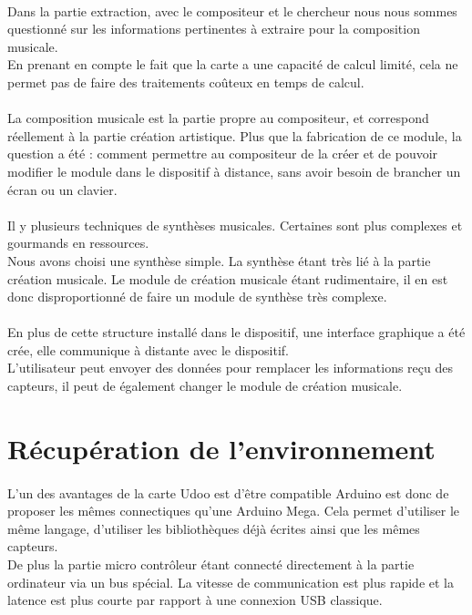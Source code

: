 \documentclass[a4paper, titlepage, oneside, 12pt]{article}%
\begin{document}
\paragraph{}
Dans la partie extraction, avec le compositeur et le chercheur nous nous sommes questionné sur les informations pertinentes à extraire pour la composition musicale.\\ 
En prenant en compte le fait que la carte a une capacité de calcul limité, cela ne permet pas de faire des traitements coûteux en temps de calcul.

\paragraph{}
La composition musicale est la partie propre au compositeur, et correspond réellement à la partie création artistique. Plus que la fabrication de ce module, la question a été :  comment permettre au compositeur de la créer et de pouvoir modifier le module dans le dispositif à distance, sans avoir besoin  de brancher un écran ou un clavier.

\paragraph{}
Il y plusieurs techniques de synthèses musicales. Certaines sont plus complexes et gourmands en ressources.\\ Nous avons choisi une synthèse simple. La synthèse étant très lié à la partie création musicale. Le module de création musicale étant rudimentaire, il en est donc disproportionné de faire un module de synthèse très complexe. 

\paragraph{}
En plus de cette structure installé dans le dispositif, une interface graphique a été crée, elle communique à distante avec le dispositif.\\
L'utilisateur peut envoyer des données pour remplacer les informations reçu des capteurs, il peut de également changer le module de création musicale.

\section{Récupération de l'environnement}
\paragraph{}
L'un des avantages de la carte Udoo est d'être compatible Arduino est donc de proposer les mêmes connectiques qu'une Arduino Mega. Cela permet d'utiliser le même langage, d'utiliser les bibliothèques déjà écrites ainsi que les mêmes capteurs.\\
De plus la partie  micro contrôleur étant connecté directement à la partie ordinateur via un bus spécial. La vitesse de communication est plus rapide et la latence est plus courte par rapport à une connexion USB classique.
\end{document}
